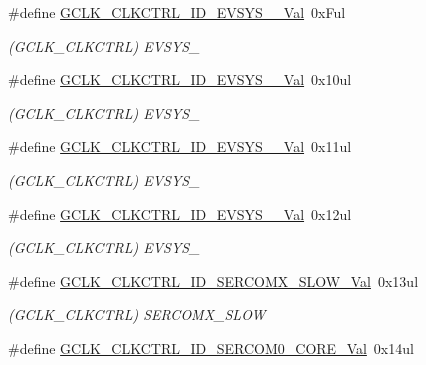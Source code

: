 \begin{DoxyCompactItemize}
\#define \mbox{\hyperlink{group___s_a_m_d21___g_c_l_k_ga4ec8917d7084d3f9634881abd59e9976}{G\+C\+L\+K\+\_\+\+C\+L\+K\+C\+T\+R\+L\+\_\+\+I\+D\+\_\+\+E\+V\+S\+Y\+S\+\_\+\_\+\+Val}}~0x\+Ful
\begin{DoxyCompactList}\small\item\em (G\+C\+L\+K\+\_\+\+C\+L\+K\+C\+T\+RL) E\+V\+S\+Y\+S\+\_ \end{DoxyCompactList}\item 
\#define \mbox{\hyperlink{group___s_a_m_d21___g_c_l_k_gaa16d3052520645978635ac4c5cf7cae6}{G\+C\+L\+K\+\_\+\+C\+L\+K\+C\+T\+R\+L\+\_\+\+I\+D\+\_\+\+E\+V\+S\+Y\+S\+\_\+\_\+\+Val}}~0x10ul
\begin{DoxyCompactList}\small\item\em (G\+C\+L\+K\+\_\+\+C\+L\+K\+C\+T\+RL) E\+V\+S\+Y\+S\+\_ \end{DoxyCompactList}\item 
\#define \mbox{\hyperlink{group___s_a_m_d21___g_c_l_k_ga4a5dad9a02f829080ec0d0c07e0f44a5}{G\+C\+L\+K\+\_\+\+C\+L\+K\+C\+T\+R\+L\+\_\+\+I\+D\+\_\+\+E\+V\+S\+Y\+S\+\_\+\_\+\+Val}}~0x11ul
\begin{DoxyCompactList}\small\item\em (G\+C\+L\+K\+\_\+\+C\+L\+K\+C\+T\+RL) E\+V\+S\+Y\+S\+\_ \end{DoxyCompactList}\item 
\#define \mbox{\hyperlink{group___s_a_m_d21___g_c_l_k_gae046a3b63da8327bfa71268d66b516eb}{G\+C\+L\+K\+\_\+\+C\+L\+K\+C\+T\+R\+L\+\_\+\+I\+D\+\_\+\+E\+V\+S\+Y\+S\+\_\+\_\+\+Val}}~0x12ul
\begin{DoxyCompactList}\small\item\em (G\+C\+L\+K\+\_\+\+C\+L\+K\+C\+T\+RL) E\+V\+S\+Y\+S\+\_ \end{DoxyCompactList}\item 
\#define \mbox{\hyperlink{group___s_a_m_d21___g_c_l_k_ga153a5b6024c662b8f816b368ccd1bdc6}{G\+C\+L\+K\+\_\+\+C\+L\+K\+C\+T\+R\+L\+\_\+\+I\+D\+\_\+\+S\+E\+R\+C\+O\+M\+X\+\_\+\+S\+L\+O\+W\+\_\+\+Val}}~0x13ul
\begin{DoxyCompactList}\small\item\em (G\+C\+L\+K\+\_\+\+C\+L\+K\+C\+T\+RL) S\+E\+R\+C\+O\+M\+X\+\_\+\+S\+L\+OW \end{DoxyCompactList}\item 
\#define \mbox{\hyperlink{group___s_a_m_d21___g_c_l_k_gaa73a1f52ac12d73c9b415d0cf7c129d8}{G\+C\+L\+K\+\_\+\+C\+L\+K\+C\+T\+R\+L\+\_\+\+I\+D\+\_\+\+S\+E\+R\+C\+O\+M0\+\_\+\+C\+O\+R\+E\+\_\+\+Val}}~0x14ul

\end{DoxyCompactItemize}
